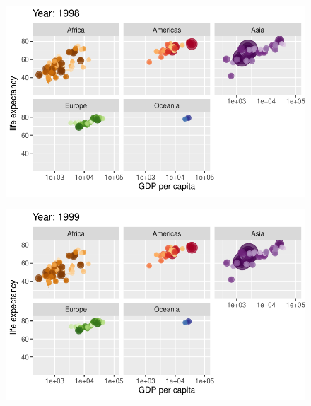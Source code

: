 \documentclass[
  letterpaper,
  DIV=11,
  numbers=noendperiod]{scrartcl}
\begin{document}
\begin{figure}[H]

{\centering \includegraphics{class05_files/figure-pdf/unnamed-chunk-24-84.pdf}

}

\end{figure}

\begin{figure}[H]

{\centering \includegraphics{class05_files/figure-pdf/unnamed-chunk-24-85.pdf}

}

\end{figure}
\end{document}
